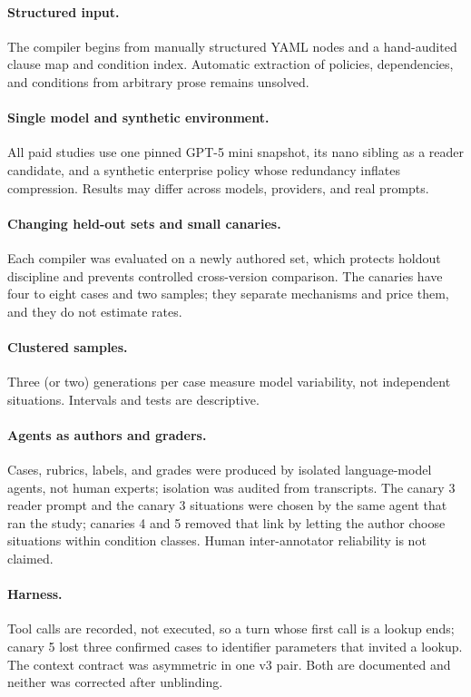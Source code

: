 \documentclass[11pt]{article}
\begin{document}
\paragraph{Structured input.} The compiler begins from manually structured YAML nodes and a hand-audited clause map and condition index. Automatic extraction of policies, dependencies, and conditions from arbitrary prose remains unsolved.

\paragraph{Single model and synthetic environment.} All paid studies use one pinned GPT-5 mini snapshot, its nano sibling as a reader candidate, and a synthetic enterprise policy whose redundancy inflates compression. Results may differ across models, providers, and real prompts.

\paragraph{Changing held-out sets and small canaries.} Each compiler was evaluated on a newly authored set, which protects holdout discipline and prevents controlled cross-version comparison. The canaries have four to eight cases and two samples; they separate mechanisms and price them, and they do not estimate rates.

\paragraph{Clustered samples.} Three (or two) generations per case measure model variability, not independent situations. Intervals and tests are descriptive.

\paragraph{Agents as authors and graders.} Cases, rubrics, labels, and grades were produced by isolated language-model agents, not human experts; isolation was audited from transcripts. The canary 3 reader prompt and the canary 3 situations were chosen by the same agent that ran the study; canaries 4 and 5 removed that link by letting the author choose situations within condition classes. Human inter-annotator reliability is not claimed.

\paragraph{Harness.} Tool calls are recorded, not executed, so a turn whose first call is a lookup ends; canary 5 lost three confirmed cases to identifier parameters that invited a lookup. The context contract was asymmetric in one v3 pair. Both are documented and neither was corrected after unblinding.
\end{document}
